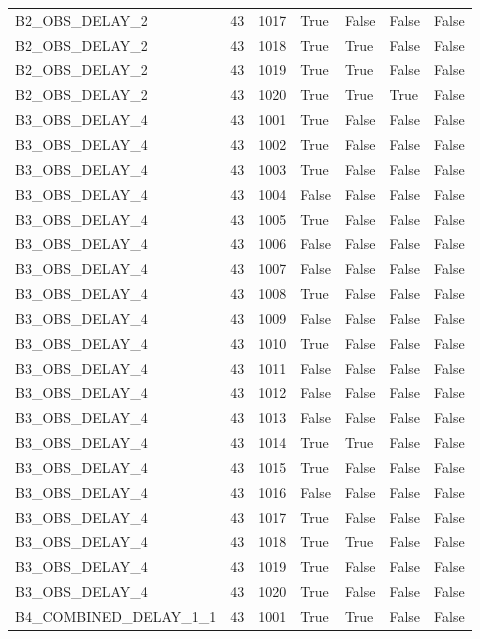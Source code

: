 \documentclass[11pt,a4paper,oneside]{book}
\begin{document}
\begin{longtable}{l l l l l l l}
B2\_OBS\_DELAY\_2 & 43 & 1017 & True & False & False & False \\
B2\_OBS\_DELAY\_2 & 43 & 1018 & True & True & False & False \\
B2\_OBS\_DELAY\_2 & 43 & 1019 & True & True & False & False \\
B2\_OBS\_DELAY\_2 & 43 & 1020 & True & True & True & False \\
B3\_OBS\_DELAY\_4 & 43 & 1001 & True & False & False & False \\
B3\_OBS\_DELAY\_4 & 43 & 1002 & True & False & False & False \\
B3\_OBS\_DELAY\_4 & 43 & 1003 & True & False & False & False \\
B3\_OBS\_DELAY\_4 & 43 & 1004 & False & False & False & False \\
B3\_OBS\_DELAY\_4 & 43 & 1005 & True & False & False & False \\
B3\_OBS\_DELAY\_4 & 43 & 1006 & False & False & False & False \\
B3\_OBS\_DELAY\_4 & 43 & 1007 & False & False & False & False \\
B3\_OBS\_DELAY\_4 & 43 & 1008 & True & False & False & False \\
B3\_OBS\_DELAY\_4 & 43 & 1009 & False & False & False & False \\
B3\_OBS\_DELAY\_4 & 43 & 1010 & True & False & False & False \\
B3\_OBS\_DELAY\_4 & 43 & 1011 & False & False & False & False \\
B3\_OBS\_DELAY\_4 & 43 & 1012 & False & False & False & False \\
B3\_OBS\_DELAY\_4 & 43 & 1013 & False & False & False & False \\
B3\_OBS\_DELAY\_4 & 43 & 1014 & True & True & False & False \\
B3\_OBS\_DELAY\_4 & 43 & 1015 & True & False & False & False \\
B3\_OBS\_DELAY\_4 & 43 & 1016 & False & False & False & False \\
B3\_OBS\_DELAY\_4 & 43 & 1017 & True & False & False & False \\
B3\_OBS\_DELAY\_4 & 43 & 1018 & True & True & False & False \\
B3\_OBS\_DELAY\_4 & 43 & 1019 & True & False & False & False \\
B3\_OBS\_DELAY\_4 & 43 & 1020 & True & False & False & False \\
B4\_COMBINED\_DELAY\_1\_1 & 43 & 1001 & True & True & False & False \\

\end{longtable}
\end{document}

